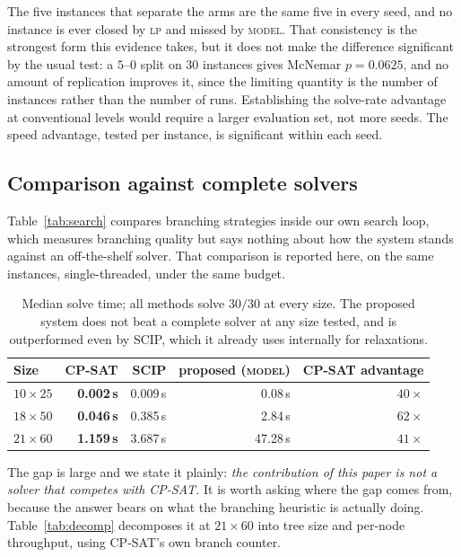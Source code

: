 \documentclass[11pt]{article}
\begin{document}
The five instances that separate the arms are the same five in every seed, and no instance is ever closed by \textsc{lp} and missed by \textsc{model}. That consistency is the strongest form this evidence takes, but it does not make the difference significant by the usual test: a $5$--$0$ split on $30$ instances gives McNemar $p=0.0625$, and no amount of replication improves it, since the limiting quantity is the number of instances rather than the number of runs. Establishing the solve-rate advantage at conventional levels would require a larger evaluation set, not more seeds. The speed advantage, tested per instance, is significant within each seed.

\subsection{Comparison against complete solvers}
\label{sec:exp-classical}

Table~\ref{tab:search} compares branching strategies inside our own search loop, which measures branching quality but says nothing about how the system stands against an off-the-shelf solver. That comparison is reported here, on the same instances, single-threaded, under the same budget.

\begin{table}[h]
\centering
\begin{tabular}{lrrrr}
\toprule
Size & CP-SAT & SCIP & proposed (\textsc{model}) & CP-SAT advantage \\
\midrule
$10\times25$ & \textbf{0.002\,s} & 0.009\,s & 0.08\,s & $40\times$ \\
$18\times50$ & \textbf{0.046\,s} & 0.385\,s & 2.84\,s & $62\times$ \\
$21\times60$ & \textbf{1.159\,s} & 3.687\,s & 47.28\,s & $41\times$ \\
\bottomrule
\end{tabular}
\caption{Median solve time; all methods solve $30/30$ at every size. The proposed system does not beat a complete solver at any size tested, and is outperformed even by SCIP, which it already uses internally for relaxations.}
\label{tab:classical}
\end{table}

The gap is large and we state it plainly: \emph{the contribution of this paper is not a solver that competes with CP-SAT.} It is worth asking where the gap comes from, because the answer bears on what the branching heuristic is actually doing. Table~\ref{tab:decomp} decomposes it at $21\times60$ into tree size and per-node throughput, using CP-SAT's own branch counter.
\end{document}
